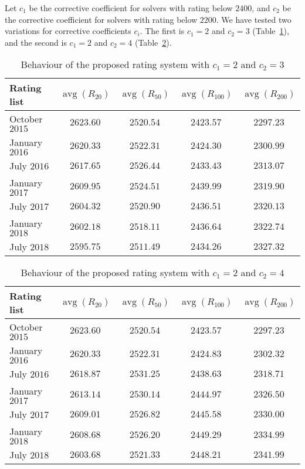 \documentclass[preprint,12pt]{article}
\DeclareMathOperator{\avg}{avg}
\begin{document}
Let $c_1$ be the corrective coefficient for solvers with rating below $2400$,
and $c_2$ be the corrective coefficient for solvers with rating below $2200$.
We have tested two variations for corrective coefficients $c_i$.
The first is $c_1=2$ and $c_2=3$ (Table~\ref{new_system_1}),
and the second is $c_1=2$ and $c_2=4$ (Table~\ref{new_system_2}).
\begin{table}[h]
\begin{center}
\begin{tabular}{|l|c|c|c|c|}
\hline
Rating list & $\avg (R_{20})$ & $\avg (R_{50})$ & $\avg (R_{100})$ & $\avg (R_{200})$\\
\hline
October $2015$ & $2623.60$ & $2520.54$ & $2423.57$ & $2297.23$\\
\hline
January $2016$ & $2620.33$ & $2522.31$ & $2424.30$ & $2300.99$\\
\hline
July $2016$ & $2617.65$ & $2526.44$ & $2433.43$ & $2313.07$\\
\hline
January $2017$ & $2609.95$ & $2524.51$ & $2439.99$ & $2319.90$\\
\hline
July $2017$ & $2604.32$ & $2520.90$ & $2436.51$ & $2320.13$\\
\hline
January $2018$ & $2602.18$ & $2518.11$ & $2436.64$ & $2322.74$\\
\hline
July $2018$ & $2595.75$ & $2511.49$ & $2434.26$ & $2327.32$\\
\hline
\end{tabular}
\caption{Behaviour of the proposed rating system with $c_1=2$ and $c_2=3$}
\label{new_system_1}
\end{center}
\end{table}

\begin{table}[h]
\begin{center}
\begin{tabular}{|l|c|c|c|c|}
\hline
Rating list & $\avg (R_{20})$ & $\avg (R_{50})$ & $\avg (R_{100})$ & $\avg (R_{200})$\\
\hline
October $2015$ & $2623.60$ & $2520.54$ & $2423.57$ & $2297.23$\\
\hline
January $2016$ & $2620.33$ & $2522.31$ & $2424.83$ & $2302.32$\\
\hline
July $2016$ & $2618.87$ & $2531.25$ & $2438.63$ & $2318.71$\\
\hline
January $2017$ & $2613.14$ & $2530.14$ & $2444.97$ & $2326.50$\\
\hline
July $2017$ & $2609.01$ & $2526.82$ & $2445.58$ & $2330.00$\\
\hline
January $2018$ & $2608.68$ & $2526.20$ & $2449.29$ & $2334.99$\\
\hline
July $2018$ & $2603.68$ & $2521.33$ & $2448.21$ & $2341.99$\\
\hline
\end{tabular}
\caption{Behaviour of the proposed rating system with $c_1=2$ and $c_2=4$}
\label{new_system_2}
\end{center}
\end{table}
\end{document}
